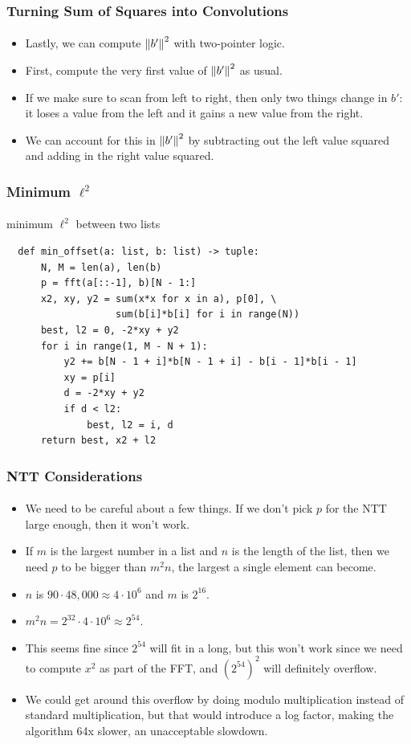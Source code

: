 \documentclass{beamer}                             %
\begin{document}
\begin{frame}
\frametitle{Turning Sum of Squares into Convolutions}
\framesubtitle{}
\begin{itemize}
  \item Lastly, we can compute \( \norm{b'}^2 \) with two-pointer logic.
  \item First, compute the very first value of \( \norm{b'}^2 \) as usual.
  \item If we make sure to scan from left to right, then
    only two things change in \( b' \): it loses a value
    from the left and it gains a new value from the right.
  \item We can account for this in \( \norm{b'}^2 \) by subtracting out the
    left value squared and adding in the right value squared.
\end{itemize}
\end{frame}

\begin{frame}[fragile]
\frametitle{Minimum \( \ell^2 \)}
\framesubtitle{}
\begin{algorithm}[H]
  \caption{minimum \( \ell^2 \) between two lists}
  \begin{verbatim}
  def min_offset(a: list, b: list) -> tuple:
      N, M = len(a), len(b)
      p = fft(a[::-1], b)[N - 1:]
      x2, xy, y2 = sum(x*x for x in a), p[0], \
                   sum(b[i]*b[i] for i in range(N))
      best, l2 = 0, -2*xy + y2
      for i in range(1, M - N + 1):
          y2 += b[N - 1 + i]*b[N - 1 + i] - b[i - 1]*b[i - 1]
          xy = p[i]
          d = -2*xy + y2
          if d < l2:
              best, l2 = i, d
      return best, x2 + l2
  \end{verbatim}
\end{algorithm}
\end{frame}

\begin{frame}
\frametitle{NTT Considerations}
\framesubtitle{}
\begin{itemize}[<+->]
  \item We need to be careful about a few things. If we don't
    pick \( p \) for the NTT large enough, then it won't work.
  \item If \( m \) is the largest number in a list and \( n \)
    is the length of the list, then we need \( p \) to be bigger
    than \( m^2 n \), the largest a single element can become.
  \item \( n \) is \( 90 \cdot 48,000 \approx 4 \cdot 10^6 \)
    and \( m \) is \( 2^{16} \).
  \item \( m^2 n = 2^{32} \cdot 4 \cdot 10^6 \approx 2^{54} \).
  \item This seems fine since \( 2^{54} \) will fit in a long, but
    this won't work since we need to compute \( x^2 \) as part of
    the FFT, and \( (2^{54})^2 \) will definitely overflow.
  \item We could get around this overflow by doing modulo multiplication
    instead of standard multiplication, but that would introduce a log
    factor, making the algorithm 64x slower, an unacceptable slowdown.
\end{itemize}
\end{frame}
\end{document}

